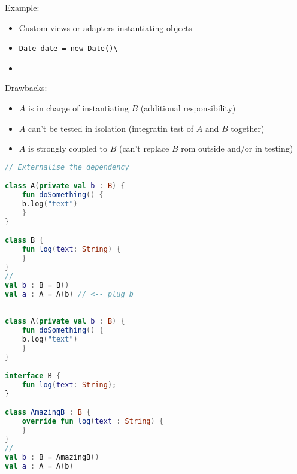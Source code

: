 \documentclass[10pt]{beamer}
\begin{document}
	\begin{frame}[fragile]
		Example:
		\begin{itemize}
			\item Custom views or adapters instantiating objects 
			\item \verb|Date date = new Date()\| 
			\item 
		\end{itemize}
	\end{frame}

	\begin{frame}[fragile]
		Drawbacks:
		\begin{itemize}
			\item $A$ is in charge of instantiating $B$ (additional responsibility)
			\item $A$ can't be tested in isolation (integratin test of $A$ and $B$ together) 
			\item $A$ is strongly coupled to $B$ (can't replace $B$ rom outside and/or in testing) 
		\end{itemize}
	\end{frame}
\begin{frame}[fragile]
\begin{lstlisting}[language=Kotlin, basicstyle=\ttfamily]
// Externalise the dependency 

class A(private val b : B) {
    fun doSomething() {
	b.log("text") 
    }
}

class B {
    fun log(text: String) {
    }
}
// 
val b : B = B()
val a : A = A(b) // <-- plug b
\end{lstlisting} 
\end{frame}

\begin{frame}[fragile]
\begin{lstlisting}[language=Kotlin, basicstyle=\ttfamily]

class A(private val b : B) {
    fun doSomething() {
	b.log("text") 
    }
}

interface B {
    fun log(text: String);
}

class AmazingB : B {
    override fun log(text : String) {
    }
}
// 
val b : B = AmazingB()
val a : A = A(b)
\end{lstlisting} 
\end{frame}
\end{document}
